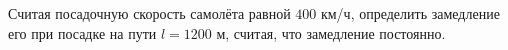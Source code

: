 Считая посадочную скорость самолёта равной $400$ км/ч, определить
замедление его при посадке на пути $l=1200$ м, считая, что замедление
постоянно.
